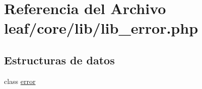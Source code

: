 \hypertarget{lib__error_8php}{\section{Referencia del Archivo leaf/core/lib/lib\-\_\-error.php}
\label{lib__error_8php}
}
\subsection*{Estructuras de datos}
\begin{DoxyCompactItemize}
\item 
class \hyperlink{classerror}{error}
\end{DoxyCompactItemize}
